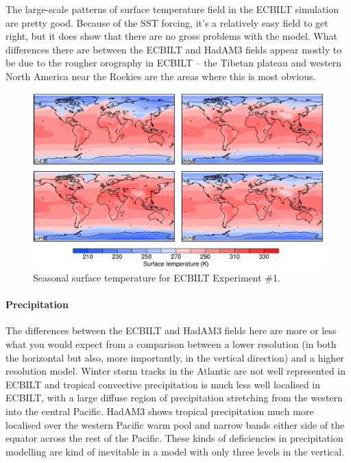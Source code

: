 \documentclass[a4paper,11pt]{article}
\begin{document}
The large-scale patterns of surface temperature field in the ECBILT
simulation are pretty good.  Because of the SST forcing, it's a
relatively easy field to get right, but it does show that there are no
gross problems with the model.  What differences there are between the
ECBILT and HadAM3 fields appear mostly to be due to the rougher
orography in ECBILT -- the Tibetan plateau and western North America
near the Rockies are the areas where this is most obvious.

\begin{figure}
  \begin{center}
    \includegraphics[width=\textwidth]{../expt-1/plots/ts-plots}
  \end{center}
  \caption{Seasonal surface temperature for ECBILT Experiment \#1.}
  \label{fig:ts-1}
\end{figure}

\paragraph{Precipitation}

The differences between the ECBILT and HadAM3 fields here are more or
less what you would expect from a comparison between a lower
resolution (in both the horizontal but also, more importantly, in the
vertical direction) and a higher resolution model.  Winter storm
tracks in the Atlantic are not well represented in ECBILT and tropical
convective precipitation is much less well localised in ECBILT, with a
large diffuse region of precipitation stretching from the western into
the central Pacific.  HadAM3 shows tropical precipitation much more
localised over the western Pacific warm pool and narrow bands either
side of the equator across the rest of the Pacific.  These kinds of
deficiencies in precipitation modelling are kind of inevitable in a
model with only three levels in the vertical.
\end{document}
